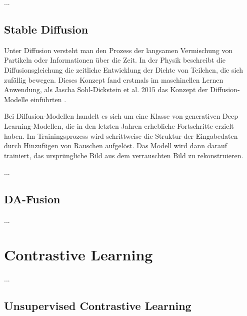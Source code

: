 ...

\subsection{Stable Diffusion}

Unter Diffusion versteht man den Prozess der langsamen Vermischung von Partikeln oder Informationen über die Zeit. In der Physik beschreibt die Diffusionsgleichung die zeitliche Entwicklung der Dichte von Teilchen, die sich zufällig bewegen. Dieses Konzept fand erstmals im maschinellen Lernen Anwendung, als Jascha Sohl-Dickstein et al. 2015 das Konzept der Diffusion-Modelle einführten \parencite{}.

Bei Diffusion-Modellen handelt es sich um eine Klasse von generativen Deep Learning-Modellen, die in den letzten Jahren erhebliche Fortschritte erzielt haben. Im Trainingsprozess wird schrittweise die Struktur der Eingabedaten durch Hinzufügen von Rauschen aufgelöst. Das Modell wird dann darauf trainiert, das ursprüngliche Bild aus dem verrauschten Bild zu rekonstruieren.

...

\subsection{DA-Fusion}

...

\section{Contrastive Learning}


...

\subsection{Unsupervised Contrastive Learning}

